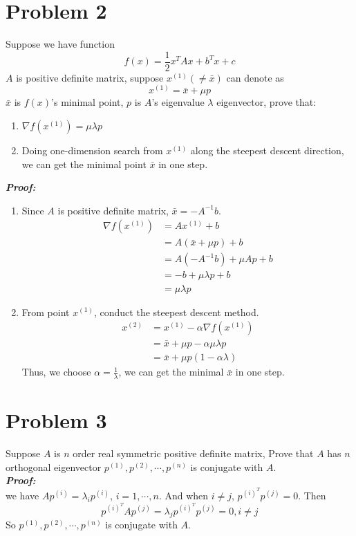 \documentclass[paper=a4, fontsize=11pt]{scrartcl} %
\numberwithin{equation}{section} %
\numberwithin{figure}{section} %
\numberwithin{table}{section} %
\begin{document}
\section{Problem 2}
Suppose we have function 
\begin{equation} \nonumber
f(x) = \frac{1}{2}x^TAx+b^Tx+c
\end{equation}
$A$ is positive definite matrix, suppose $x^{(1)}(\neq\bar{x})$ can denote as
 \begin{equation} \nonumber
x^{(1)} = \bar{x} + \mu p
\end{equation}
$\bar{x}$ is $f(x)$'s minimal point, $p$ is $A$'s eigenvalue $\lambda$ eigenvector, prove that:
\begin{enumerate}
\item $\nabla f(x^{(1)})=\mu\lambda p$
\item Doing one-dimension search from $x^{(1)}$ along the steepest descent direction, we can get the minimal point
$\bar{x}$ in one step.
\end{enumerate}
\emph{\textbf{Proof:}}\\
\begin{enumerate}
\item Since $A$ is positive definite matrix, $\bar{x}=-A^{-1}b$.\\
\begin{align*}\nonumber
\nabla f(x^{(1)})& = Ax^{(1)} + b \\
& = A(\bar{x}+\mu p) + b \\
& = A(-A^{-1}b) + \mu Ap + b\\
& = -b + \mu\lambda p + b \\
& = \mu\lambda p
\end{align*}
\item From point $x^{(1)}$, conduct the steepest descent method.
\begin{align*}\nonumber
x^{(2)} &= x^{(1)}-\alpha\nabla f(x^{(1)})\\
& = \bar{x} + \mu p - \alpha \mu\lambda p \\
& = \bar{x} + \mu p(1-\alpha\lambda) 
\end{align*}
Thus, we choose $\alpha = \frac{1}{\lambda}$, we can get the minimal $\bar{x}$ in one step.
\end{enumerate}

\section{Problem 3}
Suppose $A$ is $n$ order real symmetric positive definite matrix, Prove that $A$ has $n$ orthogonal eigenvector $p^{(1)}, p^{(2)},\cdots, p^{(n)}$ is conjugate with $A$.
\\
\emph{\textbf{Proof:}}\\
we have $Ap^{(i)}=\lambda_i p^{(i)}$, $i=1,\cdots,n$. And when $i\neq j$, $p^{{(i)}^T}p^{(j)} = 0$. Then
\begin{equation}\nonumber
p^{{(i)}^T}Ap^{(j)} = \lambda_j p^{{(i)}^T}p^{(j)} = 0, i \neq j
\end{equation}
So $p^{(1)}, p^{(2)},\cdots, p^{(n)}$ is conjugate with $A$.
\end{document}
